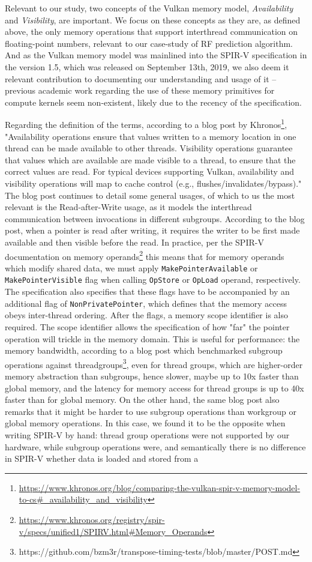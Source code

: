 \documentclass{IEEEtran}
\begin{document}
Relevant to our study, two concepts of the Vulkan memory model, \textit{Availability} and \textit{Visibility}, are important. We focus on these concepts as they are, as defined above, the only memory operations that support interthread communication on floating-point numbers, relevant to our case-study of \gls{RF} prediction algorithm. And as the Vulkan memory model was mainlined into the SPIR-V specification in the version 1.5, which was released on September 13th, 2019, we also deem it relevant contribution to documenting our understanding and usage of it -- previous academic work regarding the use of these memory primitives for compute kernels seem non-existent, likely due to the recency of the specification.

Regarding the definition of the terms, according to a blog post by Khronos\footnote{\url{https://www.khronos.org/blog/comparing-the-vulkan-spir-v-memory-model-to-cs#_availability_and_visibility}}, "Availability operations ensure that values written to a memory location in one thread can be made available to other threads. Visibility operations guarantee that values which are available are made visible to a thread, to ensure that the correct values are read. For typical devices supporting Vulkan, availability and visibility operations will map to cache control (e.g., flushes/invalidates/bypass)." The blog post continues to detail some general usages, of which to us the most relevant is the Read-after-Write usage, as it models the interthread communication between invocations in different subgroups. According to the blog post, when a pointer is read after writing, it requires the writer to be first made available and then visible before the read. In practice, per the SPIR-V documentation on memory operands\footnote{\url{https://www.khronos.org/registry/spir-v/specs/unified1/SPIRV.html#Memory_Operands}} this means that for memory operands which modify shared data, we must apply \verb|MakePointerAvailable| or \verb|MakePointerVisible| flag when calling \verb|OpStore| or \verb|OpLoad| operand, respectively. The specification also specifies that these flags have to be accompanied by an additional flag of \verb|NonPrivatePointer|, which defines that the memory access obeys inter-thread ordering. After the flags, a memory scope identifier is also required. The scope identifier allows the specification of how "far" the pointer operation will trickle in the memory domain. This is useful for performance: the memory bandwidth, according to a blog post which benchmarked subgroup operations against threadgroups\footnote{https://github.com/bzm3r/transpose-timing-tests/blob/master/POST.md}, even for thread groups, which are higher-order memory abstraction than subgroups, hence slower, maybe up to 10x faster than global memory, and the latency for memory access for thread groups is up to 40x faster than for global memory. On the other hand, the same blog post also remarks that it might be harder to use subgroup operations than workgroup or global memory operations. In this case, we found it to be the opposite when writing SPIR-V by hand: thread group operations were not supported by our hardware, while subgroup operations were, and semantically there is no difference in SPIR-V whether data is loaded and stored from a 
\end{document}
